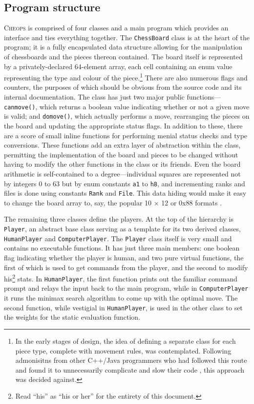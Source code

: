 \documentclass[12pt]{article}
\begin{document}
\subsection{Program structure}

\textsc{Cheops} is comprised of four classes and a main program which
provides an interface and ties everything together. The
\texttt{ChessBoard} class is at the heart of the program; it is a
fully encapsulated data structure allowing for the manipulation of
chessboards and the pieces thereon contained. The board itself is
represented by a privately-declared 64-element array, each cell
containing an enum value representing the type and colour of the
piece.\footnote{In the early stages of design, the idea of defining a
  separate class for each piece type, complete with movement rules,
  was contemplated.  Following admonisitns from other C++/Java
  programmers who had followed this route and found it to
  unnecessarily complicate and slow their code \cite{smaaland}, this
  approach was decided against.} There are also numerous flags and
counters, the purposes of which should be obvious from the source code
and its internal documentation. The class has just two major public
functions---\texttt{can{\textunderscore}move()}, which returns a
boolean value indicating whether or not a given move is valid; and
\texttt{do{\textunderscore}move()}, which actually performs a move,
rearranging the pieces on the board and updating the appropriate
status flags. In addition to these, there are a score of small inline
functions for performing menial status checks and type conversions.
These functions add an extra layer of abstraction within the class,
permitting the implementation of the board and pieces to be changed
without having to modify the other functions in the class or its
friends. Even the board arithmetic is self-contained to a
degree---individual squares are represented not by integers 0 to 63
but by enum constants \texttt{a1} to \texttt{h8}, and incrementing
ranks and files is done using constants \texttt{Rank} and
\texttt{File}. This data hiding would make it easy to change the board
array to, say, the popular 10 $\times$ 12 or 0x88 formats
\cite{eppstein}.

The remaining three classes define the players. At the top of the
hierarchy is \texttt{Player}, an abstract base class serving as a
template for its two derived classes, \texttt{HumanPlayer} and
\texttt{ComputerPlayer}.  The \texttt{Player} class itself is very
small and contains no executable functions. It has just three main
members: one boolean flag indicating whether the player is human, and
two pure virtual functions, the first of which is used to get commands
from the player, and the second to modify his\footnote{Read ``his'' as
  ``his or her'' for the entirety of this document.} stats. In
\texttt{HumanPlayer}, the first function prints out the familiar
command prompt and relays the input back to the main program, while in
\texttt{ComputerPlayer} it runs the minimax search algorithm to come
up with the optimal move.  The second function, while vestigial in
\texttt{HumanPlayer}, is used in the other class to set the weights
for the static evaluation function.
\end{document}
